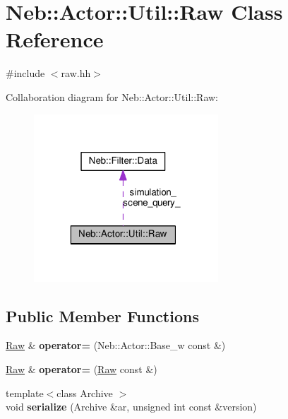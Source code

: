 \hypertarget{classNeb_1_1Actor_1_1Util_1_1Raw}{\section{Neb\-:\-:Actor\-:\-:Util\-:\-:Raw Class Reference}
\label{classNeb_1_1Actor_1_1Util_1_1Raw}
}


{\ttfamily \#include $<$raw.\-hh$>$}



Collaboration diagram for Neb\-:\-:Actor\-:\-:Util\-:\-:Raw\-:
\nopagebreak
\begin{figure}[H]
\begin{center}
\leavevmode
\includegraphics[width=196pt]{classNeb_1_1Actor_1_1Util_1_1Raw__coll__graph}
\end{center}
\end{figure}
\subsection*{Public Member Functions}
\begin{DoxyCompactItemize}
\item 
\hypertarget{classNeb_1_1Actor_1_1Util_1_1Raw_a40bc87aaaccadc6ffc449eeff796e2a6}{\hyperlink{classNeb_1_1Actor_1_1Util_1_1Raw}{Raw} \& {\bfseries operator=} (Neb\-::\-Actor\-::\-Base\-\_\-w const \&)}\label{classNeb_1_1Actor_1_1Util_1_1Raw_a40bc87aaaccadc6ffc449eeff796e2a6}

\item 
\hypertarget{classNeb_1_1Actor_1_1Util_1_1Raw_a8c4b27f90d4128a7fc6758f2b4605d22}{\hyperlink{classNeb_1_1Actor_1_1Util_1_1Raw}{Raw} \& {\bfseries operator=} (\hyperlink{classNeb_1_1Actor_1_1Util_1_1Raw}{Raw} const \&)}\label{classNeb_1_1Actor_1_1Util_1_1Raw_a8c4b27f90d4128a7fc6758f2b4605d22}

\item 
\hypertarget{classNeb_1_1Actor_1_1Util_1_1Raw_aa18bcb6b2c4a468e3cc393ad20fff990}{{\footnotesize template$<$class Archive $>$ }\\void {\bfseries serialize} (Archive \&ar, unsigned int const \&version)}\label{classNeb_1_1Actor_1_1Util_1_1Raw_aa18bcb6b2c4a468e3cc393ad20fff990}

\end{DoxyCompactItemize}
